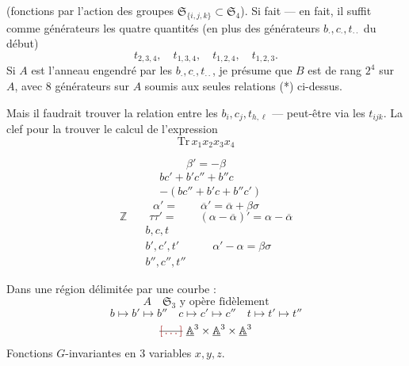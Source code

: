 \documentclass[11pt,a4paper]{article}
\begin{document}
(fonctions   par l'action des groupes
$\mathfrak{S}_{\{i,j,k\}} \subset \mathfrak{S}_4$). Si fait --- en fait, il suffit comme
générateurs les quatre quantités (en plus des générateurs $b_\cdot, c_\cdot, t_{\cdot\cdot}$
du début)
\[
  t_{2,3,4}, \quad t_{1,3,4}, \quad t_{1,2,4}, \quad t_{1,2,3} .
\]
Si $A$ est l'anneau engendré par les $b_\cdot, c_\cdot, t_{\cdot\cdot}$, je présume que $B$
est  de rang $2^4$ sur $A$, avec $8$ 
générateurs sur $A$ soumis aux seules relations
(*) ci-dessus.

Mais il faudrait trouver la relation entre les $b_i, c_j, t_{h,\ell}$ --- peut-être
via les $t_{ijk}$. La clef pour la trouver  le calcul de l'expression
\[
  \mathrm{Tr}\, x_1 x_2 x_3 x_4
\]

\[
  \beta' = -\beta
\]
\[
  \begin{aligned}
    &bc' + b'c'' + b''c \\
    &- (bc'' + b'c + b''c')
  \end{aligned}
\]
\[
  \alpha' = \qquad \overline{\alpha}' = \overline{\alpha} + \beta\sigma
\]
\[
  \mathbb{Z} \qquad \tau\tau' = \qquad (\alpha - \overline{\alpha})' = \alpha - \overline{\alpha}
\]
\[
  \begin{matrix} b, c, t \\ b', c', t' \\ b'', c'', t'' \end{matrix}
  \qquad \alpha' - \alpha = \beta\sigma
\]

Dans une région délimitée par une courbe :
\[
  A \quad \mathfrak{S}_3 \text{ y opère fidèlement}
\]
\[
  b \mapsto b' \mapsto b'' \quad c \mapsto c' \mapsto c'' \quad t \mapsto t' \mapsto t''
\]
\[
  \text{\struck{$\ill{}$}}\ \underline{\mathbb{A}}^3 \times \underline{\mathbb{A}}^3 \times \underline{\mathbb{A}}^3
\]
Fonctions $G$-invariantes en $3$ variables $x, y, z$.

\end{document}
